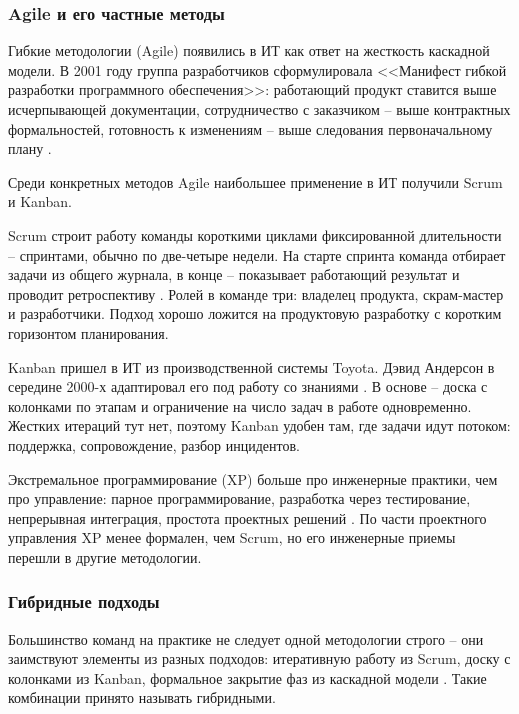 \subsubsection{Agile и его частные методы}

Гибкие методологии (Agile) появились в ИТ как ответ на жесткость каскадной модели. В 2001 году группа разработчиков сформулировала <<Манифест гибкой разработки программного обеспечения>>: работающий продукт ставится выше исчерпывающей документации, сотрудничество с заказчиком -- выше контрактных формальностей, готовность к изменениям -- выше следования первоначальному плану \cite{art_agile_modern}.

Среди конкретных методов Agile наибольшее применение в ИТ получили Scrum и Kanban.

Scrum строит работу команды короткими циклами фиксированной длительности -- спринтами, обычно по две-четыре недели. На старте спринта команда отбирает задачи из общего журнала, в конце -- показывает работающий результат и проводит ретроспективу \cite{sutherland_scrum}. Ролей в команде три: владелец продукта, скрам-мастер и разработчики. Подход хорошо ложится на продуктовую разработку с коротким горизонтом планирования.

Kanban пришел в ИТ из производственной системы Toyota. Дэвид Андерсон в середине 2000-х адаптировал его под работу со знаниями \cite{anderson_kanban}. В основе -- доска с колонками по этапам и ограничение на число задач в работе одновременно. Жестких итераций тут нет, поэтому Kanban удобен там, где задачи идут потоком: поддержка, сопровождение, разбор инцидентов.

Экстремальное программирование (XP) больше про инженерные практики, чем про управление: парное программирование, разработка через тестирование, непрерывная интеграция, простота проектных решений \cite{beck_xp}. По части проектного управления XP менее формален, чем Scrum, но его инженерные приемы перешли в другие методологии.

\subsubsection{Гибридные подходы}

Большинство команд на практике не следует одной методологии строго -- они заимствуют элементы из разных подходов: итеративную работу из Scrum, доску с колонками из Kanban, формальное закрытие фаз из каскадной модели \cite{art_hybrid_pm}. Такие комбинации принято называть гибридными.

